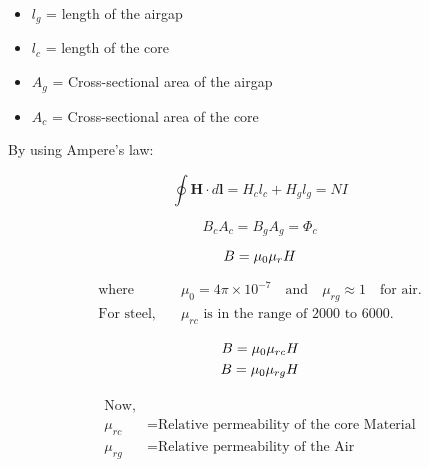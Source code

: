 \documentclass{article}
\begin{document}
\huge
\begin{itemize}
    \item \( l_g \) = length of the airgap
    \item \( l_c \) = length of the core
    \item \( A_g \) = Cross-sectional area of the airgap
    \item \( A_c \) = Cross-sectional area of the core
\end{itemize}

By using Ampere's law:

\begin{equation}
    \oint \mathbf{H} \cdot d\mathbf{l} = H_c l_c + H_g l_g = NI \tag{1}
\end{equation}





\begin{equation}
    B_c A_c = B_g A_g = \Phi_c \tag{2}
\end{equation}

\vspace{0.5cm} %
\begin{equation*}
   \Huge  {B} = \mu_0 \mu_r {H}
\end{equation*}

\begin{align*}
\text{where} \quad & \mu_0 = 4 \pi \times 10^{-7} \quad \text{and} \quad \mu_{rg} \approx 1\quad \text{for air}. \\
\text{For steel,} \quad & \mu_{rc} \text{ is in the range of } 2000 \text{ to } 6000.
\end{align*}

\vspace{0.5cm} %
\begin{equation*}
\begin{split}
   \Huge  {B} = \mu_0 \mu_{rc} {H}\\
  \Huge  {B} = \mu_0 \mu_{rg} {H}
\end{split}
\end{equation*}




\begin{equation*}
\begin{split}
\begin{aligned}
\text{Now,} \\
\mu_{rc} &= \text{Relative permeability of the core Material}\\
\mu_{rg} &= \text{Relative permeability of the Air}
\end{aligned}
\end{split}
\end{equation*}
\end{document}
